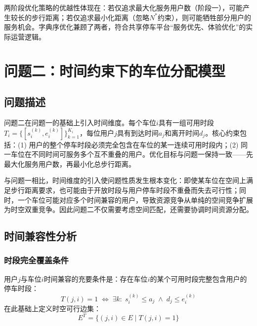 \documentclass[12pt,a4paper]{ctexart}
\begin{document}
两阶段优化策略的优越性体现在：若仅追求最大化服务用户数（阶段一），可能产生较长的步行距离；若仅追求最小化距离（忽略$N^*$约束），则可能牺牲部分用户的服务机会。字典序优化兼顾了两者，符合共享停车平台``服务优先、体验优化''的实际运营逻辑。


\section{问题二：时间约束下的车位分配模型}

\subsection{问题描述}

问题二在问题一的基础上引入时间维度。每个车位$i$具有一组可用时段$T_i = \{[s_i^{(k)}, e_i^{(k)}]\}_{k=1}^{K_i}$，每位用户$j$具有到达时间$a_j$和离开时间$d_j$。核心约束包括：(1) 用户的整个停车时段必须完全包含在车位的某一连续可用时段内；(2) 同一车位在不同时间可服务多个互不重叠的用户。优化目标与问题一保持一致——先最大化服务用户数，再最小化总步行距离。

与问题一相比，时间维度的引入使问题性质发生根本变化：即使某车位在空间上满足步行距离要求，也可能由于开放时段与用户停车时段不重叠而失去可行性；同时，一个车位可能对应多个时间兼容的用户，导致资源竞争从单纯的空间竞争扩展为时空双重竞争。因此问题二不仅需要考虑空间匹配，还需要协调时间资源分配。

\subsection{时间兼容性分析}

\subsubsection{时段完全覆盖条件}

用户$j$与车位$i$时间兼容的充要条件是：存在车位$i$的某个可用时段完整包含用户的停车时段：
\begin{equation}
  T(j,i)=1 \;\Longleftrightarrow\; \exists k: \; s_i^{(k)} \leq a_j \;\wedge\; d_j \leq e_i^{(k)}
\end{equation}
在此基础上定义时空可行边集：
\begin{equation}
  E^T = \{(j,i) \in E \mid T(j,i)=1\}
\end{equation}
\end{document}
